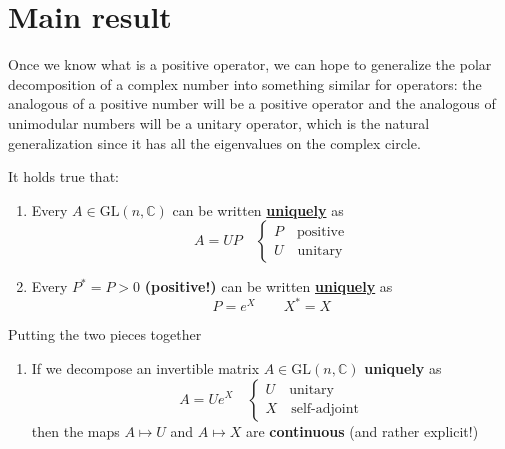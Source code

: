 \documentclass[../main.tex]{subfiles}
\begin{document}
\section{Main result}
Once we know what is a positive operator, we can hope to generalize the polar decomposition of a complex number into something similar for operators: the analogous of a positive number will be a positive operator and the analogous of unimodular numbers will be a unitary operator, which is the natural generalization since it has all the eigenvalues on the complex circle.
\begin{theorem} It holds true that:
\renewcommand{\labelenumi}{\arabic{enumi})}
\begin{enumerate}
    \item Every $A\in\textrm{GL}(n,\mathbb{C})$ can be written \underline{\textbf{uniquely}} as 
    \[
    A=UP \quad \begin{cases}
    P \quad \textrm{positive}\\
    U \quad \textrm{unitary}
    \end{cases}
    \]
    \item Every $P^\ast=P>0$ \textbf{(positive!)} can be written \underline{\textbf{uniquely}} as
    \[
    P=e^X \qquad X^\ast=X
    \]
\end{enumerate}
Putting the two pieces together
\renewcommand{\labelenumi}{3)}
\begin{enumerate}
    \item If we decompose an invertible matrix $A\in\textrm{GL}(n,\mathbb{C})$ \textbf{uniquely} as
    \[
    A=Ue^X \quad \begin{cases}
    U \quad \textrm{unitary}\\
    X \quad \textrm{self-adjoint}
    \end{cases}
    \]
    then the maps $ A \mapsto U$ and $A\mapsto X$ are \textbf{continuous} (and rather explicit!)
\end{enumerate}
\end{theorem}
\end{document}

